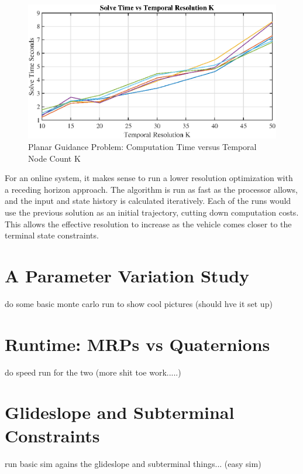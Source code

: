 \begin{figure}[!htbp] 
\label{}
  \centering
  \includegraphics[width=\textwidth]{figs/solvetimevsK.eps}
  \caption{Planar Guidance Problem: Computation Time versus Temporal Node Count K}
  \label{fig:solvetimes}
\end{figure}


For an online system, it makes sense to run a lower resolution optimization with a receding horizon approach. The algorithm is run as fast as the processor allows, and the input and state history is calculated iteratively. Each of the runs would use the previous solution as an initial trajectory, cutting down computation costs. This allows the effective resolution to increase as the vehicle comes closer to the terminal state constraints.


\section{A Parameter Variation Study}
do some basic monte carlo run to show cool pictures (should hve it set up)


\section{Runtime: MRPs vs Quaternions}
do speed run for the two (more shit toe work.....)

\section{Glideslope and Subterminal Constraints}
run basic sim agains the glideslope and subterminal things... (easy sim)
